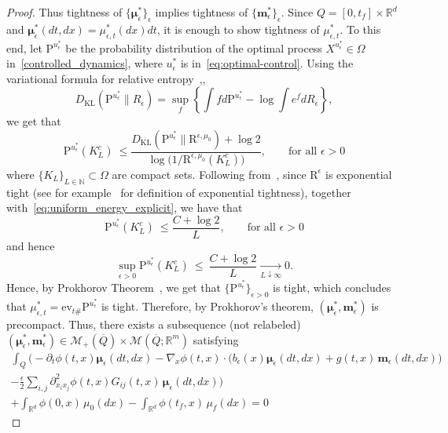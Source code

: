 \documentclass{amsart}
\numberwithin{equation}{section}
\newcommand{\R}{\mathbb{R}}
\newcommand{\KL}{D_{\mathrm{KL}}}
\begin{document}
\begin{proof}
Thus tightness of $\{\boldsymbol\mu^*_\epsilon\}_\epsilon$ implies tightness of $\{\mathbf m^*_\epsilon\}_\epsilon$. Since $Q=[0,t_f]\times\R^d$ and $\boldsymbol\mu^*_\epsilon(dt,dx)=\mu^*_{\epsilon,t}(dx)dt$, it is enough to show tightness of $\mu^*_{\epsilon,t}$. To this end, let $\mathrm{P}^{u_{\epsilon}^*}$ be the probability distribution of the optimal process $ X^{u^*_{\epsilon}}\in \Omega$ in~\eqref{controlled_dynamics}, where $u^*_\epsilon$ is in~\eqref{eq:optimal-control}.
Using the variational formula for relative entropy~\cite[\S6.6]{DemboZeitouni1998},\cite[\S 1.4]{DupuisEllis1997},
\[
D_{\mathrm{KL}}(\mathrm{P}^{u_{\epsilon}^*} \| R_{\epsilon}) = \sup_{f} \left\{ \int f d\mathrm{P}^{u_{\epsilon}^*} - \log \int e^{f} dR_{\epsilon} \right\},
\]
we get that 
\[
\mathrm{P}^{u_{\epsilon}^*}(K_L^c)\ \le\frac{ \KL(\mathrm{P}^{u_{\epsilon}^*}\|\mathrm{R}^{\epsilon,\mu_0})+\log 2}{\log\big(1/\mathrm{R}^{\epsilon,\mu_0}(K_L^c)\big)},\qquad\text{for all $\epsilon>0$}
\]
where $\{K_L\}_{L\in\mathbb{N}}\subset\Omega$ are compact sets. Following from~\cite[Theorem~4.3]{BoueDupuis1998}, since $\mathrm R^\epsilon $ is exponential tight (see for example~\cite[pp~8]{DemboZeitouni1998} for definition of exponential tightness), together with~\eqref{eq:uniform_energy_explicit}, we have that 
\[
\mathrm{P}^{u_{\epsilon}^*}(K_L^c)\ \le\frac{C+\log 2}{L},\qquad\text{for all $\epsilon>0$}
\]
and hence 
\[
\sup_{\epsilon>0} \mathrm{P}^{u_{\epsilon}^*}(K_L^c)\ \le\ \frac{C+\log 2}{L}\xrightarrow[L\downarrow \infty]{}0.
\]
Hence, by Prokhorov Theorem~\cite[Theorem~5.1]{Billingsley1995}, we get that $\{\mathrm{P}^{u_{\epsilon}^*}\}_{\epsilon>0}$ is tight, which concludes that $\mu^*_{\epsilon,t}=\mathrm{ev}_{t\#}\mathrm{P}^{u_{\epsilon}^*}$ is tight. Therefore, by Prokhorov's theorem, $(\boldsymbol{\mu}_\epsilon^*, \mathbf{m}_\epsilon^*)$ is precompact. Thus, there exists a subsequence (not relabeled) $(\boldsymbol{\mu}_\epsilon^*, \mathbf{m}_\epsilon^*) \in \mathcal{M}_+(\overline{Q}) \times \mathcal{M}(\overline{Q}; \mathbb{R}^m)$ satisfying %
\begin{multline}\label{eq:FP-weak}
\int_Q\!\Big(
-\partial_t\phi(t,x)\boldsymbol\mu_\epsilon(dt,dx)
- \nabla_x\phi(t,x)\cdot \big(b_\epsilon(x)\boldsymbol\mu_\epsilon(dt,dx) + g(t,x)\,\mathbf m_\epsilon(dt,dx)\big) \\
- \tfrac{\epsilon}{2}\sum_{i,j}\partial^2_{x_ix_j}\phi(t,x) G_{ij}(t,x)\,\boldsymbol\mu_\epsilon(dt,dx)
\Big) \\+\!\int_{\mathbb R^d}\!\phi(0,x)\,\mu_0(dx)-\int_{\mathbb R^d}\!\phi(t_f,x)\,\mu_f(dx)=0    

\end{multline}
\end{proof}
\end{document}

